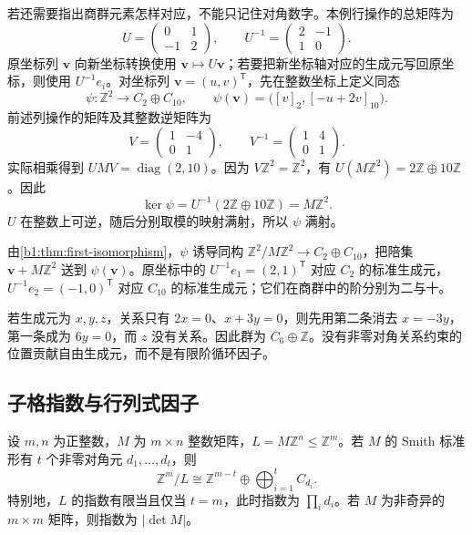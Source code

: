 \ProseParagraphBreak
若还需要指出商群元素怎样对应，不能只记住对角数字。本例行操作的总矩阵为
\[
	U=\begin{pmatrix}0&1\\-1&2\end{pmatrix},\qquad
	U^{-1}=\begin{pmatrix}2&-1\\1&0\end{pmatrix}.
\]
原坐标列 \(\mathbf v\) 向新坐标转换使用 \(\mathbf v\mapsto U\mathbf v\)；若要把新坐标轴对应的生成元写回原坐标，则使用 \(U^{-1}e_i\)。对坐标列 \(\mathbf v=(u,v)^{\mathsf T}\)，先在整数坐标上定义同态
\[
	\psi:\mathbb Z^2\longrightarrow C_2\oplus C_{10},\qquad \psi(\mathbf v)=\bigl([v]_2,[-u+2v]_{10}\bigr).
\]
前述列操作的矩阵及其整数逆矩阵为
\[
	V=\begin{pmatrix}1&-4\\0&1\end{pmatrix},\qquad
	V^{-1}=\begin{pmatrix}1&4\\0&1\end{pmatrix}.
\]
实际相乘得到 \(UMV=\operatorname{diag}(2,10)\)。因为 \(V\mathbb Z^2=\mathbb Z^2\)，有 \(U(M\mathbb Z^2)=2\mathbb Z\oplus10\mathbb Z\)。因此
\[
	\ker\psi=U^{-1}(2\mathbb Z\oplus10\mathbb Z)=M\mathbb Z^2.
\]
\(U\) 在整数上可逆，随后分别取模的映射满射，所以 \(\psi\) 满射。

\ProseParagraphBreak
由\cref{b1:thm:first-isomorphism}，\(\psi\) 诱导同构 \(\mathbb Z^2/M\mathbb Z^2\rightarrow C_2\oplus C_{10}\)，把陪集 \(\mathbf v+M\mathbb Z^2\) 送到 \(\psi(\mathbf v)\)。原坐标中的 \(U^{-1}e_1=(2,1)^{\mathsf T}\) 对应 \(C_2\) 的标准生成元，\(U^{-1}e_2=(-1,0)^{\mathsf T}\) 对应 \(C_{10}\) 的标准生成元；它们在商群中的阶分别为二与十。

\ProseParagraphBreak
若生成元为 \(x,y,z\)，关系只有 \(2x=0\)、\(x+3y=0\)，则先用第二条消去 \(x=-3y\)，第一条成为 \(6y=0\)，而 \(z\) 没有关系。因此群为 \(C_6\oplus\mathbb Z\)。没有非零对角关系约束的位置贡献自由生成元，而不是有限阶循环因子。

\subsection{子格指数与行列式因子}
\label{b1:subsec:0904:02}

\begin{proposition}[子格指数与商群结构]\label{b1:prop:lattice-index}
	设 \(m,n\) 为正整数，\(M\) 为 \(m\times n\) 整数矩阵，\(L=M\mathbb Z^n\le\mathbb Z^m\)。若 \(M\) 的 Smith 标准形有 \(t\) 个非零对角元 \(d_1,\ldots,d_t\)，则
	\[
		\mathbb Z^m/L\cong\mathbb Z^{m-t}\oplus \bigoplus_{i=1}^t C_{d_i}.
	\]
	特别地，\(L\) 的指数有限当且仅当 \(t=m\)，此时指数为 \(\prod_i d_i\)。若 \(M\) 为非奇异的 \(m\times m\) 矩阵，则指数为 \(|\det M|\)。
\end{proposition}

